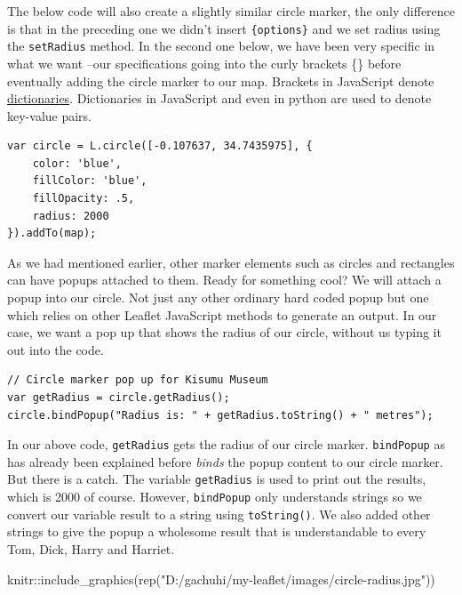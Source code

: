 \documentclass[
]{book}
\newenvironment{Shaded}{\begin{snugshade}}{\end{snugshade}}
\newcommand{\FunctionTok}[1]{\textcolor[rgb]{0.00,0.00,0.00}{#1}}
\newcommand{\NormalTok}[1]{#1}
\newcommand{\SpecialCharTok}[1]{\textcolor[rgb]{0.00,0.00,0.00}{#1}}
\newcommand{\StringTok}[1]{\textcolor[rgb]{0.31,0.60,0.02}{#1}}
\begin{document}
The below code will also create a slightly similar circle marker, the only difference is that in the preceding one we didn't insert \texttt{\{options\}} and we set radius using the \texttt{setRadius} method. In the second one below, we have been very specific in what we want --our specifications going into the curly brackets \{\} before eventually adding the circle marker to our map. Brackets in JavaScript denote \href{https://flexiple.com/javascript/javascript-dictionary/}{dictionaries}. Dictionaries in JavaScript and even in python are used to denote key-value pairs.

\begin{verbatim}
var circle = L.circle([-0.107637, 34.7435975], {
    color: 'blue',
    fillColor: 'blue',
    fillOpacity: .5,
    radius: 2000
}).addTo(map);
\end{verbatim}

As we had mentioned earlier, other marker elements such as circles and rectangles can have popups attached to them. Ready for something cool? We will attach a popup into our circle. Not just any other ordinary hard coded popup but one which relies on other Leaflet JavaScript methods to generate an output. In our case, we want a pop up that shows the radius of our circle, without us typing it out into the code.

\begin{verbatim}
// Circle marker pop up for Kisumu Museum
var getRadius = circle.getRadius();
circle.bindPopup("Radius is: " + getRadius.toString() + " metres");
\end{verbatim}

In our above code, \texttt{getRadius} gets the radius of our circle marker. \texttt{bindPopup} as has already been explained before \emph{binds} the popup content to our circle marker. But there is a catch. The variable \texttt{getRadius} is used to print out the results, which is 2000 of course. However, \texttt{bindPopup} only understands strings so we convert our variable result to a string using \texttt{toString()}. We also added other strings to give the popup a wholesome result that is understandable to every Tom, Dick, Harry and Harriet.

\begin{Shaded}
\begin{Highlighting}[]
\NormalTok{knitr}\SpecialCharTok{::}\FunctionTok{include\_graphics}\NormalTok{(}\FunctionTok{rep}\NormalTok{(}\StringTok{"D:/gachuhi/my{-}leaflet/images/circle{-}radius.jpg"}\NormalTok{))}
\end{Highlighting}
\end{Shaded}
\end{document}
